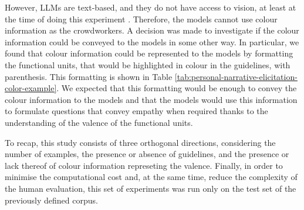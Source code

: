 
However, LLMs are text-based, and they do not have access to vision, at least at the time of doing this experiment \cite{chatgpt-see}. Therefore, the models cannot use colour information as the crowdworkers. A decision was made to investigate if the colour information could be conveyed to the models in some other way. In particular, we found that colour information could be represented to the models by formatting the functional units, that would be highlighted in colour in the guidelines, with parenthesis. This formatting is shown in Table \ref{tab:personal-narrative-elicitation-color-example}. We expected that this formatting would be enough to convey the colour information to the models and that the models would use this information to formulate questions that convey empathy when required thanks to the understanding of the valence of the functional units. 

% 
To recap, this study consists of three orthogonal directions, considering the number of examples, the presence or absence of guidelines, and the presence or lack thereof of colour information represeting the valence. 
Finally, in order to minimise the computational cost and, at the same time, reduce the complexity of the human evaluation, this set of experiments was run only on the test set of the previously defined corpus. 
